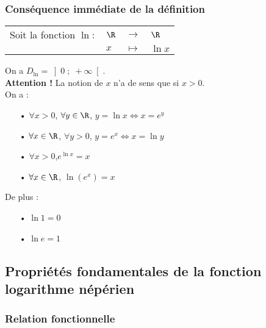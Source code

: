 \subsubsection{Conséquence immédiate de la définition}

\begin{tabular}{llll}
Soit la fonction  $\ln :$ & $\R$ & $\longrightarrow$ & $\R$ \\
& $x$ & $\longmapsto$ & $\ln x$ \\
\end{tabular}

On a $D_{\ln} = \left]0 \; ; \; +\infty\right[$. \\

\textbf{Attention !} La notion de $x$ n'a de sens que si $x > 0$. \\

On a : \\

\begin{itemize}
\item[•] $\forall x > 0$, $\forall y \in \R$, $y = \ln x \Longleftrightarrow x = e^y$ \\
\item[•] $\forall x \in \R$, $\forall y > 0$, $y = e^x \Longleftrightarrow x = \ln y$ \\
\item[•] $\forall x > 0$,$ e^{\ln x} = x$ \\
\item[•] $\forall x \in \R$, $\ln\left(e^x\right) = x$ \\
\end{itemize}

\vspace*{.3cm}

De plus : \\

\begin{itemize}
\item[•] $\ln 1 = 0$ \\
\item[•] $\ln e = 1$ \\
\end{itemize}

\subsection{Propriétés fondamentales de la fonction logarithme népérien}

\subsubsection{Relation fonctionnelle}

